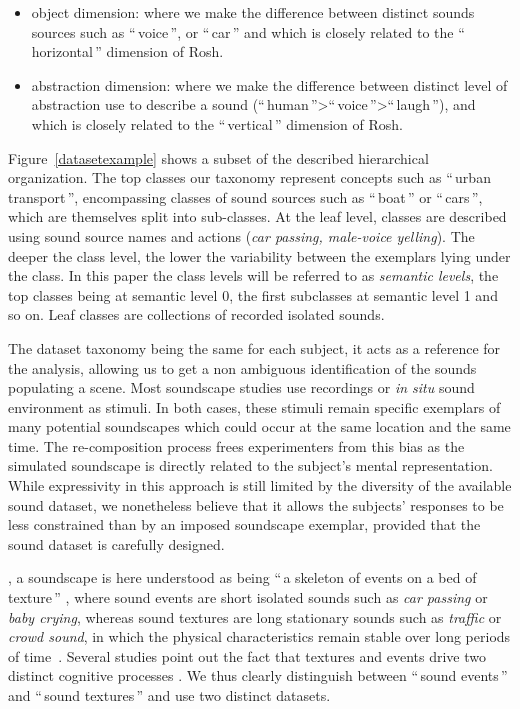 \documentclass[twoside,twocolumn]{article}
\begin{document}
\begin{itemize}
\item object dimension: where we make the difference between distinct sounds sources such as ``\,voice\,'', or ``\,car\,'' and which is closely related to the ``\,horizontal\,'' dimension of Rosh.
\item abstraction dimension: where we make the difference between distinct level of abstraction use to describe a sound (``\,human\,''>``\,voice\,''>``\,laugh\,''), and which is closely related to the ``\,vertical\,'' dimension of Rosh.
\end{itemize}

Figure~\ref{datasetexample} shows a subset of the described hierarchical organization. The top classes our taxonomy represent concepts such as ``\,urban transport\,'', encompassing classes of sound sources such as ``\,boat\,'' or  ``\,cars\,'', which are themselves split into sub-classes. At the leaf level, classes are described using sound source names and actions (\textit{car passing, male-voice yelling}). The deeper the class level, the lower the variability between the exemplars lying under the class. In this paper the class levels will be referred to as \emph{semantic levels}, the top classes being at semantic level 0, the first subclasses at semantic level 1 and so on. Leaf classes are collections of recorded isolated sounds. 

The dataset taxonomy being the same for each subject, it acts as a reference for the analysis, allowing us to get a non ambiguous identification of the sounds populating a scene. Most soundscape studies use recordings or \textit{in situ} sound environment as stimuli. In both cases, these stimuli remain specific exemplars of many potential soundscapes which could occur at the same location and the same time. The re-composition process frees experimenters from this bias as the simulated soundscape is directly related to the subject's mental representation. While expressivity in this approach is still limited by the diversity of the available sound dataset, we nonetheless believe that it allows the subjects' responses to be less constrained than by an imposed soundscape exemplar, provided that the sound dataset is carefully designed.

, a soundscape  is here understood as being  ``\,a skeleton of events on a bed of texture\,'' \cite{nelken_ear_2013}, where sound events are short isolated sounds such as \textit{car passing} or \textit{baby crying}, whereas sound textures are long stationary  sounds such as \textit{traffic} or \textit{crowd sound}, in which the physical characteristics remain stable over long periods of time~\cite{saint-arnaud_classification_1995}. Several studies point out the fact that textures and events drive two distinct cognitive processes \cite{maffiolo_caracterisation_1999, mcdermott2013summary}. We thus clearly distinguish between ``\,sound events\,'' and ``\,sound textures\,'' and use two distinct datasets. 
\end{document}

